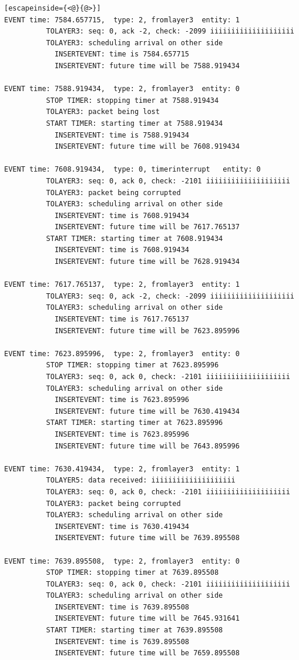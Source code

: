 \documentclass[paper=a4, fontsize=11pt]{scrartcl}
\numberwithin{equation}{section}		%
\numberwithin{figure}{section}			%
\numberwithin{table}{section}				%
\begin{document}
\begin{lstlisting}[escapeinside={<@}{@>}]
EVENT time: 7584.657715,  type: 2, fromlayer3  entity: 1
          TOLAYER3: seq: 0, ack -2, check: -2099 iiiiiiiiiiiiiiiiiiii
          TOLAYER3: scheduling arrival on other side
            INSERTEVENT: time is 7584.657715
            INSERTEVENT: future time will be 7588.919434

EVENT time: 7588.919434,  type: 2, fromlayer3  entity: 0
          STOP TIMER: stopping timer at 7588.919434
          TOLAYER3: packet being lost
          START TIMER: starting timer at 7588.919434
            INSERTEVENT: time is 7588.919434
            INSERTEVENT: future time will be 7608.919434

EVENT time: 7608.919434,  type: 0, timerinterrupt   entity: 0
          TOLAYER3: seq: 0, ack 0, check: -2101 iiiiiiiiiiiiiiiiiiii
          TOLAYER3: packet being corrupted
          TOLAYER3: scheduling arrival on other side
            INSERTEVENT: time is 7608.919434
            INSERTEVENT: future time will be 7617.765137
          START TIMER: starting timer at 7608.919434
            INSERTEVENT: time is 7608.919434
            INSERTEVENT: future time will be 7628.919434

EVENT time: 7617.765137,  type: 2, fromlayer3  entity: 1
          TOLAYER3: seq: 0, ack -2, check: -2099 iiiiiiiiiiiiiiiiiiii
          TOLAYER3: scheduling arrival on other side
            INSERTEVENT: time is 7617.765137
            INSERTEVENT: future time will be 7623.895996

EVENT time: 7623.895996,  type: 2, fromlayer3  entity: 0
          STOP TIMER: stopping timer at 7623.895996
          TOLAYER3: seq: 0, ack 0, check: -2101 iiiiiiiiiiiiiiiiiiii
          TOLAYER3: scheduling arrival on other side
            INSERTEVENT: time is 7623.895996
            INSERTEVENT: future time will be 7630.419434
          START TIMER: starting timer at 7623.895996
            INSERTEVENT: time is 7623.895996
            INSERTEVENT: future time will be 7643.895996

EVENT time: 7630.419434,  type: 2, fromlayer3  entity: 1
          TOLAYER5: data received: iiiiiiiiiiiiiiiiiiii
          TOLAYER3: seq: 0, ack 0, check: -2101 iiiiiiiiiiiiiiiiiiii
          TOLAYER3: packet being corrupted
          TOLAYER3: scheduling arrival on other side
            INSERTEVENT: time is 7630.419434
            INSERTEVENT: future time will be 7639.895508

EVENT time: 7639.895508,  type: 2, fromlayer3  entity: 0
          STOP TIMER: stopping timer at 7639.895508
          TOLAYER3: seq: 0, ack 0, check: -2101 iiiiiiiiiiiiiiiiiiii
          TOLAYER3: scheduling arrival on other side
            INSERTEVENT: time is 7639.895508
            INSERTEVENT: future time will be 7645.931641
          START TIMER: starting timer at 7639.895508
            INSERTEVENT: time is 7639.895508
            INSERTEVENT: future time will be 7659.895508


\end{lstlisting}
\end{document}
